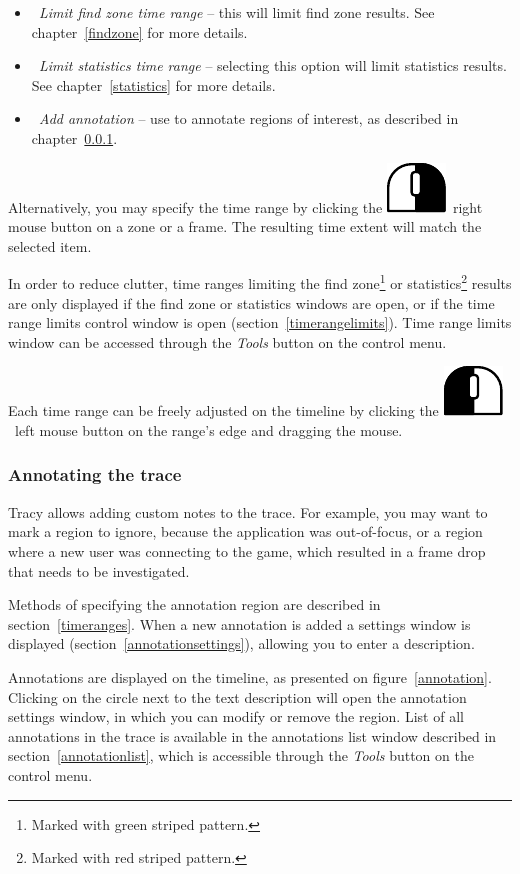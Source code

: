 \documentclass[hidelinks,titlepage,a4paper]{article}
\newcommand{\LMB}{\includegraphics[height=.8\baselineskip]{icons/lmb}}
\newcommand{\RMB}{\includegraphics[height=.8\baselineskip]{icons/rmb}}
\begin{document}
\begin{itemize}
\item \emph{\faSearch{}~Limit find zone time range} -- this will limit find zone results. See chapter~\ref{findzone} for more details.
\item \emph{\faSortAmountUp{}~Limit statistics time range} -- selecting this option will limit statistics results. See chapter~\ref{statistics} for more details.
\item \emph{\faStickyNote{}~Add annotation} -- use to annotate regions of interest, as described in chapter~\ref{annotatingtrace}.
\end{itemize}

Alternatively, you may specify the time range by clicking the \RMB{}~right mouse button on a zone or a frame. The resulting time extent will match the selected item.

In order to reduce clutter, time ranges limiting the find zone\footnote{Marked with green striped pattern.} or statistics\footnote{Marked with red striped pattern.} results are only displayed if the find zone or statistics windows are open, or if the time range limits control window is open (section~\ref{timerangelimits}). Time range limits window can be accessed through the \emph{\faTools{} Tools} button on the control menu.

Each time range can be freely adjusted on the timeline by clicking the \LMB{}~left mouse button on the range's edge and dragging the mouse.

\subsubsection{Annotating the trace}
\label{annotatingtrace}

Tracy allows adding custom notes to the trace. For example, you may want to mark a region to ignore, because the application was out-of-focus, or a region where a new user was connecting to the game, which resulted in a frame drop that needs to be investigated.

Methods of specifying the annotation region are described in section~\ref{timeranges}. When a new annotation is added a settings window is displayed (section~\ref{annotationsettings}), allowing you to enter a description.

Annotations are displayed on the timeline, as presented on figure~\ref{annotation}. Clicking on the circle next to the text description will open the annotation settings window, in which you can modify or remove the region. List of all annotations in the trace is available in the annotations list window described in section~\ref{annotationlist}, which is accessible through the \emph{\faTools{} Tools} button on the control menu.
\end{document}
